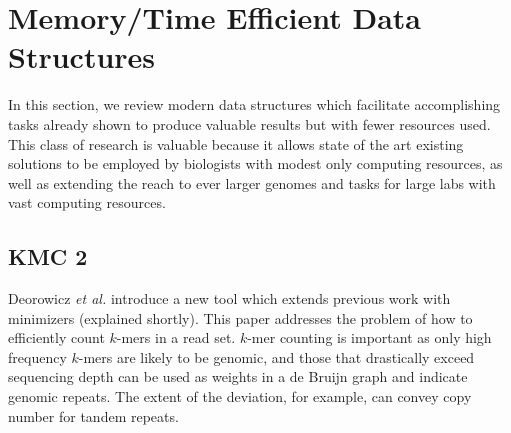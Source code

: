 \documentclass[doctor]{thesis}
\begin{document}



 

\makeatletter{}\section{Memory/Time Efficient Data Structures}

In this section, we review modern data structures which facilitate accomplishing tasks already shown to produce valuable results but with fewer resources used.  This class of research is valuable because it allows state of the art existing solutions to be employed by biologists with modest only computing resources, as well as extending the reach to ever larger genomes and tasks for large labs with vast computing resources.

\subsection{KMC 2}

Deorowicz \emph{et al.} \cite{deorowicz2015kmc} introduce a new tool which extends previous work with minimizers (explained shortly).
This paper addresses the problem of how to efficiently count $k$-mers in a read set.
$k$-mer counting is important as only high frequency $k$-mers are likely to be genomic, and those that drastically exceed sequencing depth can be used as weights in a de Bruijn graph and indicate genomic repeats.  The extent of the deviation, for example, can convey copy number for tandem repeats.
\end{document}

